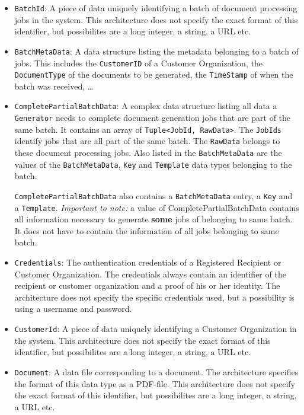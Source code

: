 \documentclass[a4paper,10pt]{article}
\begin{document}
\begin{itemize}
	\item \texttt{BatchId}: A piece of data uniquely identifying a batch of document processing jobs in the system. This architecture does not specify the exact format of this identifier, but possibilites are a long integer, a string, a URL etc.
	
	\item \texttt{BatchMetaData}: A data structure listing the metadata belonging to a batch of jobs. This includes the \texttt{CustomerID} of a Customer Organization, the \texttt{DocumentType} of the documents to be generated, the \texttt{TimeStamp} of when the batch was received, \dots
	
	\item \texttt{CompletePartialBatchData}: A complex data structure listing all data a \texttt{Generator} needs to complete document generation jobs that are part of the same batch. It contains an array of \texttt{Tuple<JobId, RawData>}. The \texttt{JobIds} identify jobs that are all part of the same batch. The \texttt{RawData} belongs to these document processing jobs. Also listed in the \texttt{BatchMetaData} are the values of the \texttt{BatchMetaData}, \texttt{Key} and \texttt{Template} data types belonging to the batch.	
	
	 \texttt{CompletePartialBatchData} also contains a \texttt{BatchMetaData} entry, a \texttt{Key} and a \texttt{Template}. \emph{Important to note:} a value of CompletePartialBatchData contains all information necessary to generate \textbf{some} jobs of belonging to same batch. It does not have to contain the information of all jobs belonging to same batch.

	\item \texttt{Credentials}: The authentication credentials of a Registered Recipient or Customer Organization. The credentials always contain an identifier of the recipient or customer organization and a proof of his or her identity. The architecture does not specify the specific credentials used, but a possibility is using a username and password.
	 
	\item \texttt{CustomerId}: A piece of data uniquely identifying a Customer Organization in the system. This architecture does not specify the exact format of this identifier, but possibilites are a long integer, a string, a URL etc.
	
	\item \texttt{Document}: A data file corresponding to a document.  The architecture specifies the format of this data type as a PDF-file. This architecture does not specify the exact format of this identifier, but possibilites are a long integer, a string, a URL etc.
	

\end{itemize}
\end{document}
